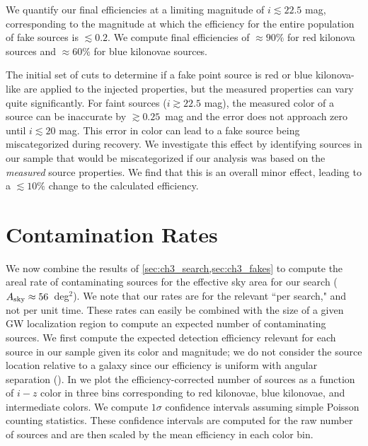 We quantify our final efficiencies at a limiting magnitude of $i \lesssim 22.5$ mag, corresponding to the magnitude at which the efficiency for the entire population of fake sources is $\lesssim0.2$. We compute final efficiencies of $\approx90\%$ for red kilonova sources and $\approx60\%$ for blue kilonovae sources.

\clearpage
The initial set of cuts to determine if a fake point source is red or blue kilonova-like are applied to the injected properties, but the measured properties can vary quite significantly. For faint sources ($i \gtrsim 22.5$ mag), the measured color of a source can be inaccurate by $\gtrsim 0.25$~mag and the error does not approach zero until $i  \lesssim 20$ mag. This error in color can lead to a fake source being miscategorized during recovery. We investigate this effect by identifying sources in our sample that would be miscategorized if our analysis was based on the {\it measured} source properties. We find that this is an overall minor effect, leading to a $\lesssim 10 \%$ change to the calculated efficiency.

\section{Contamination Rates}
\label{sec:ch3_contam_rates}
We now combine the results of \cref{sec:ch3_search,sec:ch3_fakes} to compute the areal rate of contaminating sources for the effective sky area for our search ($A_{\rm sky} \approx56$~deg$^2$). We note that our rates are for the relevant ``per search," and not per unit time. These rates can easily be combined with the size of a given GW localization region to compute an expected number of contaminating sources. We first compute the expected detection efficiency relevant for each source in our sample given its color and magnitude; we do not consider the source location relative to a galaxy since our efficiency is uniform with angular separation (). In  we plot the efficiency-corrected number of sources as a function of $i-z$ color in three bins corresponding to red kilonovae, blue kilonovae, and intermediate colors. We compute $1\sigma$ confidence intervals assuming simple Poisson counting statistics. These confidence intervals are computed for the raw number of sources and are then scaled by the mean efficiency in each color bin.

